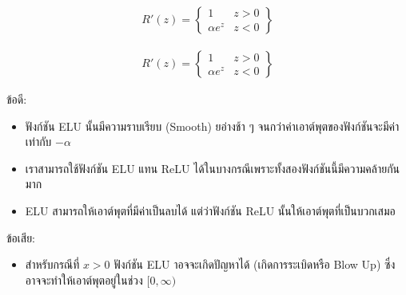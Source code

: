 \begin{itemize}
\begin{figure}[H]
\begin{subfigure}{0.5\textwidth}
            \caption{%
                \begin{equation}
                    \begin{split}R'(z) = \begin{Bmatrix} 1 & z>0 \\
                        \alpha e^z & z<0 \end{Bmatrix}\end{split}
                \end{equation}
            }
            \label{fig:actfunc_elu_der}
        \end{subfigure}
    \end{figure}
    ข้อดี:
    \begin{itemize}
        \item ฟังก์ชัน ELU นั้นมีความราบเรียบ (Smooth) ยอ่างช้า ๆ จนกว่าค่าเอาต์พุตของฟังก์ชันจะมีค่าเท่ากับ $-\alpha$
        
        \item เราสามารถใช้ฟังก์ชัน ELU แทน ReLU ได้ในบางกรณีเพราะทั้งสองฟังก์ชันนี้มีความคล้ายกันมาก
        
        \item ELU สามารถให้เอาต์พุตที่มีค่าเป็นลบได้ แต่ว่าฟังก์ชัน ReLU นั้นให้เอาต์พุตที่เป็นบวกเสมอ
    \end{itemize}
    ข้อเสีย:
    \begin{itemize}
        \item สำหรับกรณีที่ $x > 0$ ฟังก์ชัน ELU าอจจะเกิดปัญหาได้ (เกิดการระเบิดหรือ Blow Up) ซึ่งอาจจะทำให้เอาต์พุตอยู่ในช่วง 
        $[0,\infty)$
    \end{itemize}


\end{itemize}
